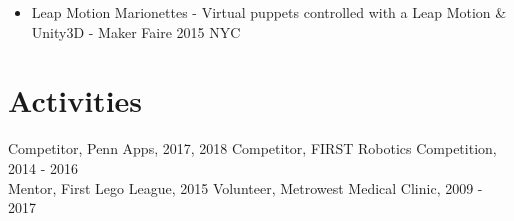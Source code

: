 \documentclass[10pt]{article}
\begin{document}
\begin{flushleft}
\begin{itemize}
		\item Leap Motion Marionettes - Virtual puppets controlled with a Leap Motion \& Unity3D - Maker Faire 2015 NYC
	\end{itemize}

\section{Activities}
	Competitor, Penn Apps, 2017, 2018 \hfill Competitor, FIRST Robotics Competition, 2014 - 2016 \\
	Mentor, First Lego League, 2015 \hfill Volunteer, Metrowest Medical Clinic, 2009 - 2017


\end{flushleft}
\end{document}
